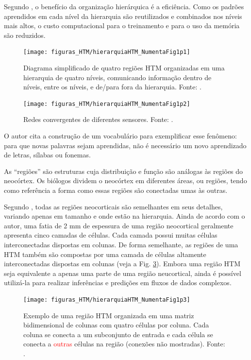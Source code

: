 Segundo \numenta, o benefício da organização hierárquica é a eficiência. Como os padrões aprendidos em cada nível da hierarquia são reutilizados e combinados nos níveis mais altos, o custo computacional para o treinamento e para o uso da memória são reduzidos. 

\begin{figure}[H]
	\centering
	\texttt{[image: figuras\_HTM/hierarquiaHTM\_NumentaFig1p1]}
	\caption{Diagrama simplificado de quatro regiões HTM organizadas em uma hierarquia de quatro
		níveis, comunicando informação dentro de níveis, entre os níveis, e de/para fora da hierarquia. Fonte: \numenta.}
	\label{fig:hierarquiahtmnumentafig1p1}
\end{figure}

\begin{figure}[H]
	\centering
	\texttt{[image: figuras\_HTM/hierarquiaHTM\_NumentaFig1p2]}
	\caption{Redes convergentes de diferentes sensores. Fonte: \numenta.}
	\label{fig:hierarquiahtmnumentafig1p2}
\end{figure}

O autor cita a construção de um vocabulário para exemplificar esse fenômeno: para que novas palavras sejam aprendidas, não é necessário um novo aprendizado de letras, sílabas ou fonemas.

As ``regiões'' são estruturas cuja distribuição e função são análogas às regiões do neocórtex. Os biólogos dividem o neocórtex em diferentes áreas, ou regiões, tendo como referência a forma como essas regiões são conectadas umas às outras. 

Segundo , todas as regiões neocorticais são semelhantes em seus detalhes, variando apenas em tamanho e onde estão na hierarquia. Ainda de acordo com o autor, uma fatia de 2 mm de espessura de uma região neocortical geralmente apresenta cinco camadas de células. Cada camada possui muitas células interconectadas dispostas em colunas. De forma semelhante, as regiões de uma HTM também são compostas por uma camada de células altamente interconectadas dispostas em colunas (veja a Fig. \ref{fig:hierarquiahtmnumentafig1p3}). Embora uma região HTM seja equivalente a apenas uma parte de uma região neucortical, ainda é possível utilizá-la para realizar inferências e predições em fluxos de dados complexos.

\begin{figure}[H]
	\centering
	\texttt{[image: figuras\_HTM/hierarquiaHTM\_NumentaFig1p3]}
	\caption{Exemplo de uma região HTM organizada em uma matriz bidimensional de colunas com quatro células por coluna. Cada coluna se conecta a um subconjunto de entrada e cada célula se conecta a \textcolor{red}{outras} células na região (conexões não mostradas). Fonte: \numenta.}
	\label{fig:hierarquiahtmnumentafig1p3}
\end{figure}

